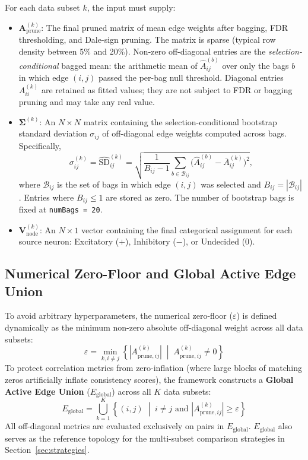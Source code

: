 \documentclass[11pt]{article}
\begin{document}
For each data subset $k$, the input must supply:
\begin{itemize}
    \item $\mathbf{A}^{(k)}_{\text{prune}}$: The final pruned matrix of mean edge weights after bagging, FDR thresholding, and Dale-sign pruning. The matrix is sparse (typical row density between 5\% and 20\%). Non-zero off-diagonal entries are the \emph{selection-conditional} bagged mean: the arithmetic mean of $\hat{A}^{(b)}_{ij}$ over only the bags $b$ in which edge $(i,j)$ passed the per-bag null threshold. Diagonal entries $A^{(k)}_{ii}$ are retained as fitted values; they are not subject to FDR or bagging pruning and may take any real value.
    \item $\boldsymbol{\Sigma}^{(k)}$: An $N \times N$ matrix containing the selection-conditional bootstrap standard deviation $\sigma_{ij}$ of off-diagonal edge weights computed across bags. Specifically,
    \[
    \sigma^{(k)}_{ij} = \widehat{\mathrm{SD}}^{(k)}_{ij}
    = \sqrt{\frac{1}{B_{ij}-1}\sum_{b \in \mathcal{B}_{ij}} \bigl(\hat{A}^{(b)}_{ij} - \bar{A}^{(k)}_{ij}\bigr)^2},
    \]
    where $\mathcal{B}_{ij}$ is the set of bags in which edge $(i,j)$ was selected and $B_{ij} = |\mathcal{B}_{ij}|$. Entries where $B_{ij} \le 1$ are stored as zero. The number of bootstrap bags is fixed at \texttt{numBags = 20}.
    \item $\mathbf{V}^{(k)}_{\text{node}}$: An $N \times 1$ vector containing the final categorical assignment for each source neuron: Excitatory ($+$), Inhibitory ($-$), or Undecided ($0$).
\end{itemize}

\subsection*{Numerical Zero-Floor and Global Active Edge Union}

To avoid arbitrary hyperparameters, the numerical zero-floor ($\varepsilon$) is defined dynamically as the minimum non-zero absolute off-diagonal weight across all data subsets:
\[
\varepsilon = \min_{k, i \neq j} \left\{ |A^{(k)}_{\text{prune}, ij}| \;\middle|\; A^{(k)}_{\text{prune}, ij} \neq 0 \right\}
\]
To protect correlation metrics from zero-inflation (where large blocks of matching zeros artificially inflate consistency scores), the framework constructs a \textbf{Global Active Edge Union} ($E_{\text{global}}$) across all $K$ data subsets:
\[
E_{\text{global}} = \bigcup_{k=1}^{K} \left\{ (i,j) \;\middle|\; i \neq j \text{ and } |A^{(k)}_{\text{prune}, ij}| \ge \varepsilon \right\}
\]
All off-diagonal metrics are evaluated exclusively on pairs in $E_{\text{global}}$. $E_{\text{global}}$ also serves as the reference topology for the multi-subset comparison strategies in Section~\ref{sec:strategies}.
\end{document}
